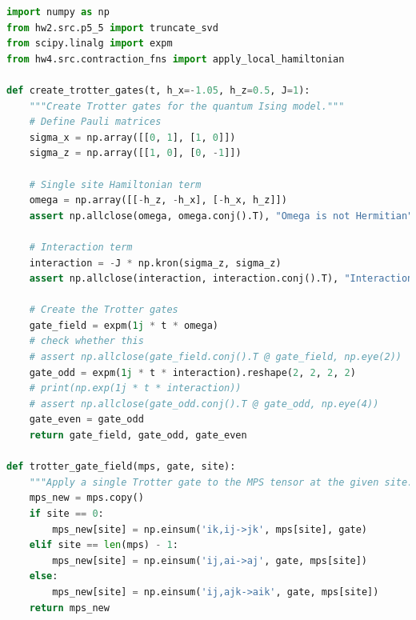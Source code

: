 \documentclass[12pt]{article}
\begin{document}
\begin{lstlisting}[language=Python]
import numpy as np
from hw2.src.p5_5 import truncate_svd
from scipy.linalg import expm
from hw4.src.contraction_fns import apply_local_hamiltonian
    
def create_trotter_gates(t, h_x=-1.05, h_z=0.5, J=1):
    """Create Trotter gates for the quantum Ising model."""
    # Define Pauli matrices
    sigma_x = np.array([[0, 1], [1, 0]])
    sigma_z = np.array([[1, 0], [0, -1]])

    # Single site Hamiltonian term
    omega = np.array([[-h_z, -h_x], [-h_x, h_z]])
    assert np.allclose(omega, omega.conj().T), "Omega is not Hermitian"
    
    # Interaction term
    interaction = -J * np.kron(sigma_z, sigma_z)
    assert np.allclose(interaction, interaction.conj().T), "Interaction is not Hermitian"
    
    # Create the Trotter gates
    gate_field = expm(1j * t * omega)
    # check whether this
    # assert np.allclose(gate_field.conj().T @ gate_field, np.eye(2))
    gate_odd = expm(1j * t * interaction).reshape(2, 2, 2, 2)
    # print(np.exp(1j * t * interaction))
    # assert np.allclose(gate_odd.conj().T @ gate_odd, np.eye(4))
    gate_even = gate_odd
    return gate_field, gate_odd, gate_even

def trotter_gate_field(mps, gate, site):
    """Apply a single Trotter gate to the MPS tensor at the given site."""
    mps_new = mps.copy()
    if site == 0:
        mps_new[site] = np.einsum('ik,ij->jk', mps[site], gate)
    elif site == len(mps) - 1:
        mps_new[site] = np.einsum('ij,ai->aj', gate, mps[site])
    else:
        mps_new[site] = np.einsum('ij,ajk->aik', gate, mps[site])
    return mps_new


\end{lstlisting}
\end{document}
